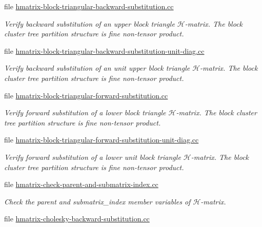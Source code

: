 \begin{DoxyCompactItemize}
file \hyperlink{hmatrix-block-triangular-backward-substitution_8cc}{hmatrix-\/block-\/triangular-\/backward-\/substitution.\+cc}
\begin{DoxyCompactList}\small\item\em Verify backward substitution of an upper block triangle $\mathcal{H}$-\/matrix. The block cluster tree partition structure is fine non-\/tensor product. \end{DoxyCompactList}\item 
file \hyperlink{hmatrix-block-triangular-backward-substitution-unit-diag_8cc}{hmatrix-\/block-\/triangular-\/backward-\/substitution-\/unit-\/diag.\+cc}
\begin{DoxyCompactList}\small\item\em Verify backward substitution of an unit upper block triangle $\mathcal{H}$-\/matrix. The block cluster tree partition structure is fine non-\/tensor product. \end{DoxyCompactList}\item 
file \hyperlink{hmatrix-block-triangular-forward-substitution_8cc}{hmatrix-\/block-\/triangular-\/forward-\/substitution.\+cc}
\begin{DoxyCompactList}\small\item\em Verify forward substitution of a lower block triangle $\mathcal{H}$-\/matrix. The block cluster tree partition structure is fine non-\/tensor product. \end{DoxyCompactList}\item 
file \hyperlink{hmatrix-block-triangular-forward-substitution-unit-diag_8cc}{hmatrix-\/block-\/triangular-\/forward-\/substitution-\/unit-\/diag.\+cc}
\begin{DoxyCompactList}\small\item\em Verify forward substitution of a lower unit block triangle $\mathcal{H}$-\/matrix. The block cluster tree partition structure is fine non-\/tensor product. \end{DoxyCompactList}\item 
file \hyperlink{hmatrix-check-parent-and-submatrix-index_8cc}{hmatrix-\/check-\/parent-\/and-\/submatrix-\/index.\+cc}
\begin{DoxyCompactList}\small\item\em Check the {\ttfamily parent} and {\ttfamily submatrix\+\_\+index} member variables of $\mathcal{H}$-\/matrix. \end{DoxyCompactList}\item 
file \hyperlink{hmatrix-cholesky-backward-substitution_8cc}{hmatrix-\/cholesky-\/backward-\/substitution.\+cc}

\end{DoxyCompactItemize}
